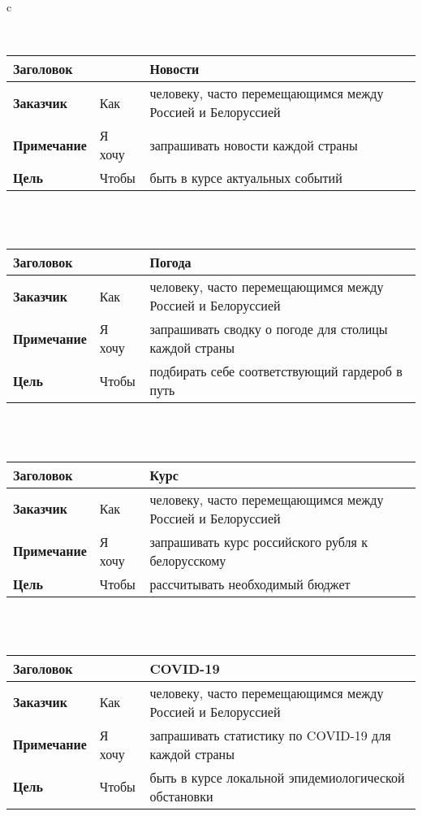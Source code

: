 \documentclass[border={3pt 0cm 3pt 0cm}]{standalone}
\begin{document}
\begin{tabular}{c}

\smallskip \\

\begin{tabular}{|l|l|l|}
	\hline
	\multicolumn{2}{|l|}{\textbf{Заголовок}} & Новости \\
		\hline
		\textbf{Заказчик} & Как & человеку, часто перемещающимся между Россией и Белоруссией \\
	\hline
	\textbf{Примечание} & Я хочу & запрашивать новости каждой страны \\
	\hline
	\textbf{Цель} & Чтобы & быть в курсе актуальных событий \\
	\hline
\end{tabular} \\

\smallskip \\

\begin{tabular}{|l|l|l|}
	\hline
	\multicolumn{2}{|l|}{\textbf{Заголовок}} & Погода \\
	\hline
	\textbf{Заказчик} & Как & человеку, часто перемещающимся между Россией и Белоруссией \\
	\hline
	\textbf{Примечание} & Я хочу & запрашивать сводку о погоде для столицы каждой страны \\
	\hline
	\textbf{Цель} & Чтобы & подбирать себе соответствующий гардероб в путь \\
	\hline
\end{tabular} \\

\smallskip \\

\begin{tabular}{|l|l|l|}
	\hline
	\multicolumn{2}{|l|}{\textbf{Заголовок}} & Курс \\
	\hline
	\textbf{Заказчик} & Как & человеку, часто перемещающимся между Россией и Белоруссией \\
	\hline
	\textbf{Примечание} & Я хочу & запрашивать курс российского рубля к белорусскому \\
	\hline
	\textbf{Цель} & Чтобы & рассчитывать необходимый бюджет \\
	\hline
\end{tabular} \\

\smallskip \\

\begin{tabular}{|l|l|l|}
	\hline
	\multicolumn{2}{|l|}{\textbf{Заголовок}} & COVID-19 \\
	\hline
	\textbf{Заказчик} & Как & человеку, часто перемещающимся между Россией и Белоруссией \\
	\hline
	\textbf{Примечание} & Я хочу & запрашивать статистику по COVID-19 для каждой страны \\
	\hline
	\textbf{Цель} & Чтобы & быть в курсе локальной эпидемиологической обстановки \\
	\hline
\end{tabular} \\

\smallskip \\

\end{tabular}
\end{document}
